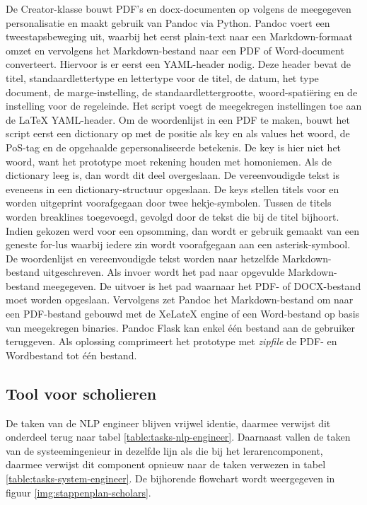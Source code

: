 De Creator-klasse bouwt PDF's en docx-documenten op volgens de meegegeven personalisatie en maakt gebruik van Pandoc via Python. Pandoc voert een tweestapsbeweging uit, waarbij het eerst plain-text naar een Markdown-formaat omzet en vervolgens het Markdown-bestand naar een PDF of Word-document converteert. Hiervoor is er eerst een YAML-header nodig. Deze header bevat de titel, standaardlettertype en lettertype voor de titel, de datum, het type document, de marge-instelling, de standaardlettergrootte, woord-spatiëring en de instelling voor de regeleinde. Het script voegt de meegekregen instellingen toe aan de LaTeX YAML-header. Om de woordenlijst in een PDF te maken, bouwt het script eerst een dictionary op met de positie als key en als values het woord, de PoS-tag en de opgehaalde gepersonaliseerde betekenis. De key is hier niet het woord, want het prototype moet rekening houden met homoniemen. Als de dictionary leeg is, dan wordt dit deel overgeslaan. De vereenvoudigde tekst is eveneens in een dictionary-structuur opgeslaan. De keys stellen titels voor en worden uitgeprint voorafgegaan door twee hekje-symbolen. Tussen de titels worden breaklines toegevoegd, gevolgd door de tekst die bij de titel bijhoort. Indien gekozen werd voor een opsomming, dan wordt er gebruik gemaakt van een geneste for-lus waarbij iedere zin wordt voorafgegaan aan een asterisk-symbool. De woordenlijst en vereenvoudigde tekst worden naar hetzelfde Markdown-bestand uitgeschreven. Als invoer wordt het pad naar opgevulde Markdown-bestand meegegeven. De uitvoer is het pad waarnaar het PDF- of DOCX-bestand moet worden opgeslaan. Vervolgens zet Pandoc het Markdown-bestand om naar een PDF-bestand gebouwd met de XeLateX engine of een Word-bestand op basis van meegekregen binaries. Pandoc Flask kan enkel één bestand aan de gebruiker teruggeven. Als oplossing comprimeert het prototype met \textit{zipfile} de PDF- en Wordbestand tot één bestand. 


\subsection{Tool voor scholieren}

De taken van de NLP engineer blijven vrijwel identie, daarmee verwijst dit onderdeel terug naar tabel \ref{table:tasks-nlp-engineer}. Daarnaast vallen de taken van de systeemingenieur in dezelfde lijn als die bij het lerarencomponent, daarmee verwijst dit component opnieuw naar de taken verwezen in tabel \ref{table:tasks-system-engineer}. De bijhorende flowchart wordt weergegeven in figuur \ref{img:stappenplan-scholars}.

